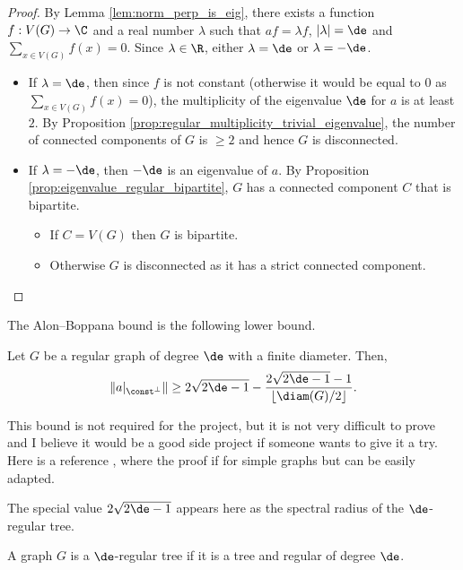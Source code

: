 \begin{proof}
  By Lemma \ref{lem:norm_perp_is_eig},
  there exists a function $f : V(G) \rightarrow \C$ and a real number $\lambda$
  such that $af=\lambda f$, $|\lambda|=\de$ and $\sum_{x \in V(G)} f(x)=0$.
  Since $\lambda \in \R$, either $\lambda = \de$ or $\lambda=-\de$.
  \begin{itemize}
    \item If $\lambda = \de$, then since $f$ is not constant (otherwise it would be
    equal to $0$ as $\sum_{x \in V(G)}f(x)=0$), the multiplicity of
    the eigenvalue $\de$ for $a$ is at least $2$. By Proposition
    \ref{prop:regular_multiplicity_trivial_eigenvalue}, the number of connected
    components of $G$ is $\geq 2$ and hence $G$ is disconnected.
    \item If $\lambda = -\de$, then $-\de$ is an eigenvalue of $a$.
    By Proposition \ref{prop:eigenvalue_regular_bipartite},
    $G$ has a connected component $C$ that is bipartite.
    \begin{itemize}
      \item If $C=V(G)$ then $G$ is bipartite.
      \item Otherwise $G$ is disconnected as it has a strict connected component.
    \end{itemize}
  \end{itemize}
\end{proof}

The Alon--Boppana bound is the following lower bound.

\begin{theorem}
  \label{thm:Alon_Boppana}
  \notready
  Let $G$ be a regular graph of degree $\de$ with a finite diameter.
  Then,
  \begin{equation*}
    \|a|_{\const^\perp}\|
     \geq 2 \sqrt{2 \de -1}
     - \frac{2 \sqrt{2 \de -1}-1}{\lfloor \diam (G) /2 \rfloor}.
  \end{equation*}
\end{theorem}

This bound is not required for the project, but it is not
very difficult to prove and I believe it would be a good side project if someone
wants to give it a try.
Here is a reference \cite{alon1986}, where the proof if for simple graphs but can
be easily adapted.

The special value $2\sqrt{2 \de - 1}$ appears here as the spectral radius of the
$\de$-regular tree.

\begin{definition}
  \label{def:regular_tree}
  A graph $G$ is a $\de$-regular tree if it is a tree and regular of degree $\de$.
\end{definition}

